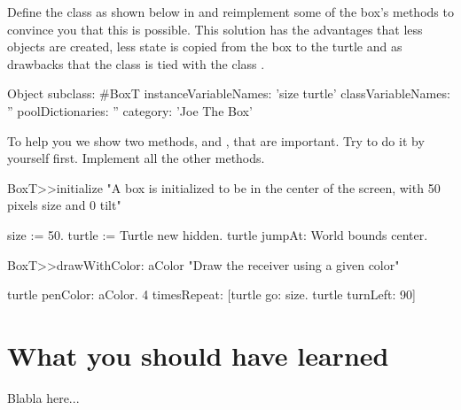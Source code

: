 Define the class  as shown below in
 and reimplement some of the box's
methods to convince you that this is possible. This solution has the
advantages that less objects are created, less state is copied from
the box to the turtle and as drawbacks that the class  is tied
with the class .

\begin{classdef}\label{cls:alternateBoxDefinition}
Object subclass: #BoxT
   instanceVariableNames: 'size turtle'
   classVariableNames: ''
   poolDictionaries: ''
   category: 'Joe The Box'
\end{classdef}


To help you we show two methods,  and 
, that are important. Try to do it by 
yourself first. Implement all the other methods. 


\begin{method}\label{mt:boxAlternateInitialize}
BoxT>>initialize
   "A box is initialized to be in the center of the screen, with 
   50 pixels size and 0 tilt"
   
   size := 50.
   turtle := Turtle new hidden.
   turtle jumpAt: World bounds center.
\end{method}

\begin{method}\label{mt:alternateDrawWith}
BoxT>>drawWithColor: aColor 
   "Draw the receiver using a given color"
	
   turtle penColor: aColor.
   4 timesRepeat: [turtle go: size.
                  turtle turnLeft: 90]
\end{method}




\section{What you should have learned}
Blabla here...







\ifx\wholebook\relax\else
\fi
